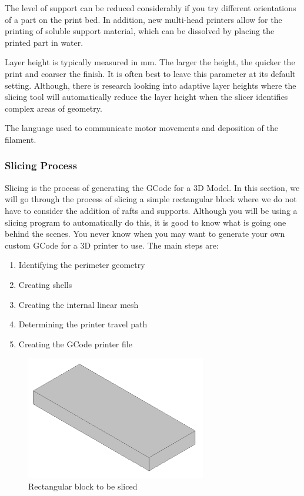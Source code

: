 The level of support can be reduced considerably if you try different orientations of a part on the print bed. In addition, new multi-head printers allow for the printing of soluble support material, which can be dissolved by placing the printed part in water.

Layer height is typically measured in \si{\milli\metre}. The larger the height, the quicker the print and coarser the finish. It is often best to leave this parameter at its default setting. Although, there is research looking into adaptive layer heights where the slicing tool will automatically reduce the layer height when the slicer identifies complex areas of geometry.\cite[-6em]{pandey2003}\cite[-1em]{sabourin1996}

The language used to communicate motor movements and deposition of the filament.


\subsubsection{Slicing Process} 

Slicing is the process of generating the GCode for a 3D Model. In this section, we will go through the process of slicing a simple rectangular block where we do not have to consider the addition of rafts and supports. Although you will be using a slicing program to automatically do this, it is good to know what is going one behind the scenes. You never know when you may want to generate your own custom GCode for a 3D printer to use. The main steps are:

\begin{enumerate}
  \item Identifying the perimeter geometry
  \item Creating shells
  \item Creating the internal linear mesh
  \item Determining the printer travel path
  \item Creating the GCode printer file
\end{enumerate}

\begin{figure}[h!]
  \centering
  \includegraphics[width=0.7\textwidth]{figs/beam_stl.png}
  \caption{Rectangular block to be sliced}\label{fig-block}
\end{figure}


